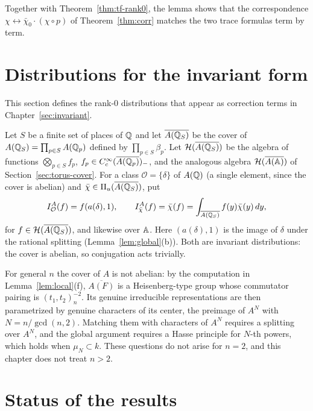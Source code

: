 Together with Theorem~\ref{thm:tf-rank0}, the lemma shows that the
correspondence $\chi\leftrightarrow\bar\chi_0\cdot(\chi\circ p)$ of
Theorem~\ref{thm:corr} matches the two trace formulas term by term.

\section{Distributions for the invariant form}\label{sec:IA}

This section defines the rank-$0$ distributions that appear as
correction terms in Chapter~\ref{sec:invariant}.


Let $S$ be a finite set of places of $\mathbb{Q}$ and let $\overline{A(\mathbb{Q}_S)}$ be
the cover of $A(\mathbb{Q}_S)=\prod_{p\in S}A(\mathbb{Q}_p)$ defined by
$\prod_{p\in S}\beta_p$. Let $\mathcal H(\overline{A(\mathbb{Q}_S)})$ be the
algebra of functions $\bigotimes_{p\in S}f_p$, $f_p\in
C_c^\infty(\overline{A(\mathbb{Q}_p)})_-$, and the analogous algebra
$\mathcal H(\overline{A(\mathbb{A})})$ of Section~\ref{sec:torus-cover}. For a
class $\mathcal O=\{\delta\}$ of $A(\mathbb{Q})$ (a single element, since the
cover is abelian) and $\bar\chi\in\Pi_u(\overline{A(\mathbb{Q}_S)})$, put
\begin{equation}\label{eq:IA}
I^A_{\mathcal O}(f)=f(a(\delta),1),\qquad
I^A_{\bar\chi}(f)=\bar\chi(f)=\int_{\overline{A(\mathbb{Q}_S)}}f(y)\bar\chi(y)\,dy,
\end{equation}
for $f\in\mathcal H(\overline{A(\mathbb{Q}_S)})$, and likewise over $\mathbb{A}$. Here
$(a(\delta),1)$ is the image of $\delta$ under the rational splitting
(Lemma~\ref{lem:global}(b)). Both are invariant distributions: the cover
is abelian, so conjugation acts trivially.

\begin{remarkrev}\label{rem:general-n-rank0}
For general $n$ the cover of $A$ is not abelian: by the computation in
Lemma~\ref{lem:local}(f), $\overline{A(F)}$ is a Heisenberg-type group
whose commutator pairing is $(t_1,t_2)_n^{-2}$. Its genuine irreducible
representations are then parametrized by genuine characters of its
center, the preimage of $A^N$ with $N=n/\gcd(n,2)$. Matching them with
characters of $A^N$ requires a splitting over $A^N$, and the global
argument requires a Hasse principle for $N$-th powers, which holds when
$\mu_N\subset k$. These questions do not arise
for $n=2$, and this chapter does not treat $n>2$.
\end{remarkrev}

\section{Status of the results}\label{sec:status3}

